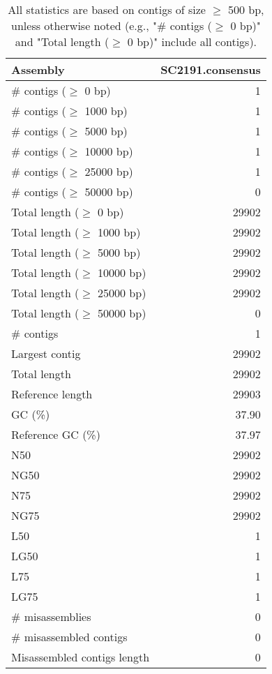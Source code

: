 \documentclass[12pt,a4paper]{article}
\begin{document}
\begin{table}[ht]
\begin{center}
\caption{All statistics are based on contigs of size $\geq$ 500 bp, unless otherwise noted (e.g., "\# contigs ($\geq$ 0 bp)" and "Total length ($\geq$ 0 bp)" include all contigs).}
\begin{tabular}{|l*{1}{|r}|}
\hline
Assembly & SC2191.consensus \\ \hline
\# contigs ($\geq$ 0 bp) & 1 \\ \hline
\# contigs ($\geq$ 1000 bp) & 1 \\ \hline
\# contigs ($\geq$ 5000 bp) & 1 \\ \hline
\# contigs ($\geq$ 10000 bp) & 1 \\ \hline
\# contigs ($\geq$ 25000 bp) & 1 \\ \hline
\# contigs ($\geq$ 50000 bp) & 0 \\ \hline
Total length ($\geq$ 0 bp) & 29902 \\ \hline
Total length ($\geq$ 1000 bp) & 29902 \\ \hline
Total length ($\geq$ 5000 bp) & 29902 \\ \hline
Total length ($\geq$ 10000 bp) & 29902 \\ \hline
Total length ($\geq$ 25000 bp) & 29902 \\ \hline
Total length ($\geq$ 50000 bp) & 0 \\ \hline
\# contigs & 1 \\ \hline
Largest contig & 29902 \\ \hline
Total length & 29902 \\ \hline
Reference length & 29903 \\ \hline
GC (\%) & 37.90 \\ \hline
Reference GC (\%) & 37.97 \\ \hline
N50 & 29902 \\ \hline
NG50 & 29902 \\ \hline
N75 & 29902 \\ \hline
NG75 & 29902 \\ \hline
L50 & 1 \\ \hline
LG50 & 1 \\ \hline
L75 & 1 \\ \hline
LG75 & 1 \\ \hline
\# misassemblies & 0 \\ \hline
\# misassembled contigs & 0 \\ \hline
Misassembled contigs length & 0 \\ \hline

\end{tabular}
\end{center}
\end{table}
\end{document}
